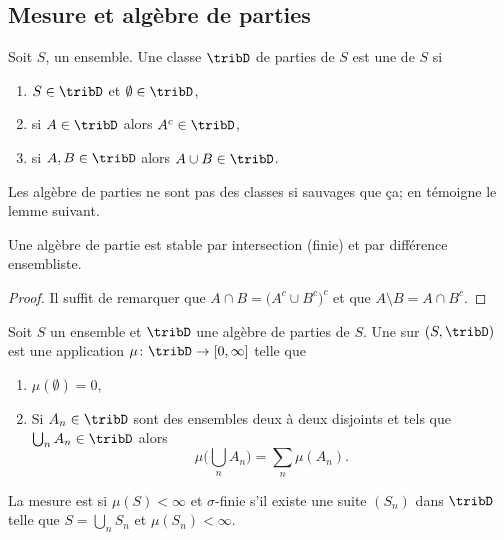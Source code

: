 \subsection{Mesure et algèbre de parties}

\begin{definition}   \label{DefTCUoogGDud}
    Soit \( S\), un ensemble. Une classe \( \tribD\) de parties de \( S\) est une  de \( S\) si
    \begin{enumerate}
        \item
            \( S\in\tribD\) et \( \emptyset\in\tribD\),
        \item
            si \( A\in\tribD\) alors \( A^c\in\tribD\),
        \item
            si \( A,B\in\tribD\) alors \( A\cup B\in\tribD\).
    \end{enumerate}
\end{definition}

Les algèbre de parties ne sont pas des classes si sauvages que ça; en témoigne le lemme suivant.
\begin{lemma}   \label{LemBFKootqXKl}
    Une algèbre de partie est stable par intersection (finie) et par différence ensembliste.
\end{lemma}

\begin{proof}
    Il suffit de remarquer que \( A\cap B=\big( A^c\cup B^c \big)^c\) et que \( A\setminus B=A\cap B^c\).
\end{proof}

\begin{definition}       \label{DefWUPHooEklLmR}
    Soit \( S\) un ensemble et \( \tribD\) une algèbre de parties de \( S\). Une  sur \( (S,\tribD)\) est une application \( \mu\colon \tribD\to \mathopen[ 0 , \infty \mathclose]\) telle que
    \begin{enumerate}
        \item
            \( \mu(\emptyset)=0\),
        \item
            Si \( A_n\in\tribD\) sont des ensembles deux à deux disjoints et tels que \( \bigcup_nA_n\in\tribD\) alors
            \begin{equation}
                \mu\big( \bigcup_nA_n \big)=\sum_n\mu(A_n).
            \end{equation}
    \end{enumerate}

    La mesure est  si \( \mu(S)<\infty\) et \( \sigma\)-finie s'il existe une suite \( (S_n)\) dans \( \tribD\) telle que \( S=\bigcup_nS_n\) et \( \mu(S_n)<\infty\).
\end{definition}

